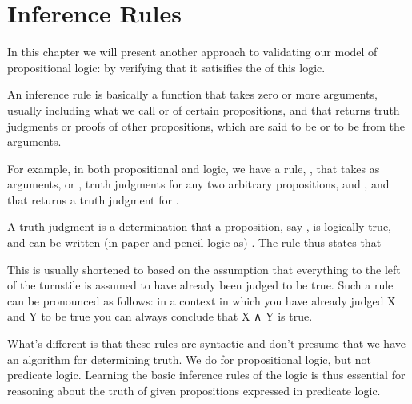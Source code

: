 \documentclass[letterpaper,10pt,english]{sphinxmanual}
\begin{document}
\section{Inference Rules}
\label{\detokenize{A_01_Propositional_Logic:inference-rules}}
\sphinxAtStartPar
In this chapter we will present another approach
to validating our model of propositional logic: by
verifying that it satisifies the 
of this logic.

\sphinxAtStartPar
An inference rule is basically a function that takes
zero or more arguments, usually including what we call
 or  of certain propositions,
and that returns truth judgments or proofs of other
propositions, which are said to be  or to be
 from the arguments.

\sphinxAtStartPar
For example, in both propositional and  logic, we have a rule, ,
that takes as arguments, or , truth judgments
for any two arbitrary propositions,  and , and
that returns a truth judgment for .

\sphinxAtStartPar
A truth judgment is a determination that a proposition,
say , is logically true, and can be written (in paper
and pencil logic as) . The 
rule thus states that 

\sphinxAtStartPar
This is usually shortened to  based on the
assumption that everything to the left of the turnstile
is assumed to have already been judged to be true. Such
a rule can be pronounced as follows: in a context in which
you have already judged X and Y to be true you can always
conclude that X ∧ Y is true.

\sphinxAtStartPar
What’s different is that these rules are syntactic and
don’t presume that we have an algorithm for determining
truth. We do for propositional logic, but not predicate
logic. Learning the basic inference rules of the logic
is thus essential for reasoning about the truth of given
propositions expressed in predicate logic.

\begin{sphinxVerbatim}[commandchars=\\\{\}]
 
 
\end{sphinxVerbatim}
\end{document}

